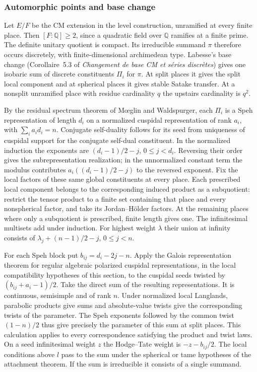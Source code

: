\subsubsection{Automorphic points and base change}\label{tw:levelpoints}


Let $E/F$ be the CM extension in the level construction, unramified at every finite place. Then $[F:\mathbb Q]\ge2$, since a quadratic field over $\mathbb Q$ ramifies at a finite prime. The definite unitary quotient is compact. Its irreducible summand $\pi$ therefore occurs discretely, with finite-dimensional archimedean type. Labesse's base change (Corollaire~5.3 of \emph{Changement de base CM et s\'eries discr\`etes}) gives one isobaric sum of discrete constituents $\Pi_i$ for $\pi$. At split places it gives the split local component and at spherical places it gives stable Satake transfer. At a nonsplit unramified place with residue cardinality $q$ the upstairs cardinality is $q^2$.

By the residual spectrum theorem of M{\oe}glin and Waldspurger, each $\Pi_i$ is a Speh representation of length $d_i$ on a normalized cuspidal representation of rank $a_i$, with $\sum_i a_id_i=n$. Conjugate self-duality follows for its seed from uniqueness of cuspidal support for the conjugate self-dual constituent. In the normalized induction the exponents are $(d_i-1)/2-j$, $0\le j<d_i$. Reversing their order gives the subrepresentation realization; in the unnormalized constant term the modulus contributes $a_i((d_i-1)/2-j)$ to the reversed exponent. Fix the local factors of these same global constituents at every place. Each prescribed local component belongs to the corresponding induced product as a subquotient: restrict the tensor product to a finite set containing that place and every nonspherical factor, and take its Jordan--Hölder factors. At the remaining places where only a subquotient is prescribed, finite length gives one. The infinitesimal multisets add under induction. For highest weight $\lambda$ their union at infinity consists of $\lambda_j+(n-1)/2-j$, $0\le j<n$.

For each Speh block put $b_{ij}=d_i-2j-n$. Apply the Galois representation theorem for regular algebraic polarized cuspidal representations, in the local compatibility hypotheses of this section, to the cuspidal seeds twisted by $(b_{ij}+a_i-1)/2$. Take the direct sum of the resulting representations. It is continuous, semisimple and of rank $n$. Under normalized local Langlands, parabolic products give sums and absolute-value twists give the corresponding twists of the parameter. The Speh exponents followed by the common twist $(1-n)/2$ thus give precisely the parameter of this sum at split places. This calculation applies to every correspondence satisfying the product and twist laws. On a seed infinitesimal weight $z$ the Hodge--Tate weight is $-z-b_{ij}/2$. The local conditions above $l$ pass to the sum under the spherical or tame hypotheses of the attachment theorem. If the sum is irreducible it consists of a single summand.

